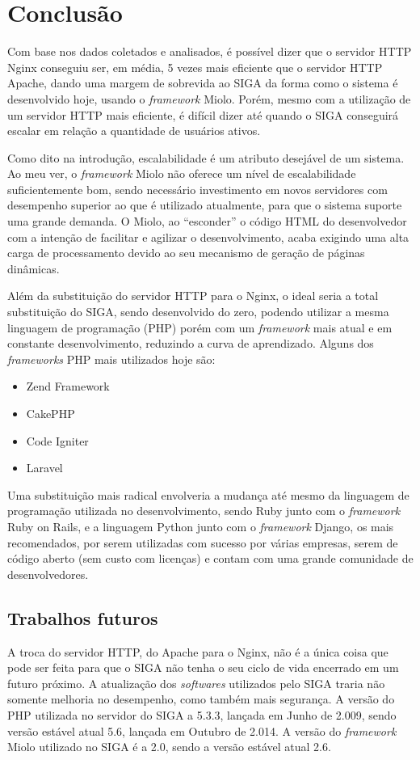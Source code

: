 \chapter{Conclusão}\label{cap:conclusao}

Com base nos dados coletados e analisados, é possível dizer que o servidor HTTP 
Nginx conseguiu ser, em média, 5 vezes mais eficiente que o servidor HTTP 
Apache, dando uma margem de sobrevida ao SIGA da forma como o sistema é 
desenvolvido hoje, usando o \textit{framework} Miolo. Porém, mesmo com a 
utilização de um servidor HTTP mais eficiente, é difícil dizer até quando o 
SIGA conseguirá escalar em relação a quantidade de usuários ativos.

Como dito na introdução, escalabilidade é um atributo desejável de um sistema. 
Ao meu ver, o \textit{framework} Miolo não oferece um nível de escalabilidade 
suficientemente bom, sendo necessário investimento em novos servidores com 
desempenho superior ao que é utilizado atualmente, para que o sistema suporte 
uma grande demanda. O Miolo, ao ``esconder'' o código HTML do desenvolvedor com 
a intenção de facilitar e agilizar o desenvolvimento, acaba exigindo uma alta 
carga de processamento devido ao seu mecanismo de geração de páginas 
dinâmicas.

Além da substituição do servidor HTTP para o Nginx, o ideal seria a total 
substituição do SIGA, sendo desenvolvido do zero, podendo utilizar a mesma 
linguagem de programação (PHP) porém com um \textit{framework} mais atual e em 
constante desenvolvimento, reduzindo a curva de aprendizado. Alguns dos  
\textit{frameworks} PHP mais utilizados hoje são:

\begin{itemize}
	\item Zend Framework
	\item CakePHP
	\item Code Igniter
	\item Laravel
\end{itemize}

Uma substituição mais radical envolveria a mudança até mesmo da linguagem de 
programação utilizada no desenvolvimento, sendo Ruby junto com o 
\textit{framework} Ruby on Rails, e a linguagem Python junto com o 
\textit{framework} Django, os mais recomendados, por serem utilizadas com 
sucesso por várias empresas, serem de código aberto (sem custo com licenças) e 
contam com uma grande comunidade de desenvolvedores.

\section{Trabalhos futuros}
A troca do servidor HTTP, do Apache para o Nginx, não é a única coisa que pode 
ser feita para que o SIGA não tenha o seu ciclo de vida encerrado em um futuro 
próximo. A atualização dos \textit{softwares} utilizados pelo SIGA traria não 
somente melhoria no desempenho, como também mais segurança. A versão do PHP 
utilizada no servidor do SIGA a 5.3.3, lançada em Junho de 2.009, sendo versão 
estável atual 5.6, lançada em Outubro de 2.014. A versão do 
\textit{framework} Miolo utilizado no SIGA é a 2.0, sendo a versão estável 
atual 2.6.

